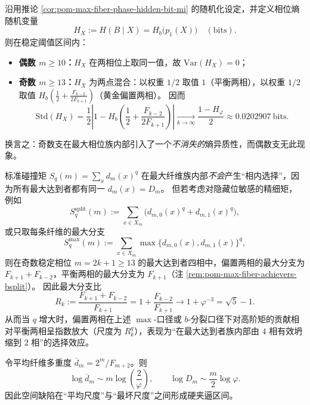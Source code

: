 \begin{corollary}\label{cor:pom-max-fiber-phase-hidden-bit-entropy-spread}
沿用推论 \ref{cor:pom-max-fiber-phase-hidden-bit-mi} 的随机化设定，并定义相位熵随机变量
\[
H_X:=H(B\mid X)=H_b\!\bigl(p_1(X)\bigr)\quad(\text{bits}).
\]
则在稳定阈值区间内：
\begin{itemize}
  \item \textbf{偶数 \(m\ge 10\)：}\(H_X\) 在两相位上取同一值，故 \(\mathrm{Var}(H_X)=0\)；
  \item \textbf{奇数 \(m\ge 13\)：}\(H_X\) 为两点混合：以权重 \(1/2\) 取值 \(1\)（平衡两相），以权重 \(1/2\) 取值 \(H_b(\tfrac12+\tfrac{F_{k-2}}{2F_{k+1}})\)（黄金偏置两相）。
  因而
  \[
  \mathrm{Std}(H_X)
  =\frac12\left|1-H_b\!\left(\frac12+\frac{F_{k-2}}{2F_{k+1}}\right)\right|
  \xrightarrow[k\to\infty]{}
  \frac{1-H_\varphi}{2}
  \approx 0.0202907\ \mathrm{bits}.
  \]
\end{itemize}
换言之：奇数支在最大相位族内部引入了一个\emph{不消失的}熵异质性，而偶数支无此现象。
\end{corollary}

\begin{remark}\label{rem:pom-max-fiber-bsplit-phase-selection}
标准碰撞矩 \(S_q(m)=\sum_x d_m(x)^q\) 在最大纤维族内部\emph{不会}产生“相内选择”，因为所有最大达到者都有同一 \(d_m(x)=D_m\)。
但若考虑对隐藏位敏感的精细矩，例如
\[
S_q^{\mathrm{split}}(m):=\sum_{x\in X_m}\bigl(d_{m,0}(x)^q+d_{m,1}(x)^q\bigr),
\]
或只取每条纤维的最大分支
\[
S_q^{\max}(m):=\sum_{x\in X_m}\max\{d_{m,0}(x),d_{m,1}(x)\}^q,
\]
则在奇数稳定相位 \(m=2k+1\ge 13\) 的最大达到者四相中，偏置两相的最大分支为 \(F_{k+1}+F_{k-2}\)，平衡两相的最大分支为 \(F_{k+1}\)（注 \ref{rem:pom-max-fiber-achievers-bsplit}）。
因此最大分支比
\[
R_k:=\frac{F_{k+1}+F_{k-2}}{F_{k+1}}=1+\frac{F_{k-2}}{F_{k+1}}\longrightarrow 1+\varphi^{-3}=\sqrt5-1.
\]
从而当 \(q\) 增大时，偏置两相在上述 \(\max\)-口径或 \(b\)-分裂口径下对高阶矩的贡献相对平衡两相呈指数放大（尺度为 \(R_k^q\)），表现为“在最大达到者族内部由 \(4\) 相有效坍缩到 \(2\) 相”的选择效应。
\end{remark}

\begin{corollary}[空间缺陷的夹逼区间]\label{cor:pom-defect-band}
令平均纤维多重度 $\overline d_m=2^m/F_{m+2}$。则
\[
\log \overline d_m\sim m\log\!\left(\frac{2}{\varphi}\right),
\qquad
\log D_m\sim \frac{m}{2}\log\varphi.
\]
因此空间缺陷在“平均尺度”与“最坏尺度”之间形成硬夹逼区间。
\end{corollary}

